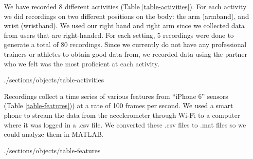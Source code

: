 We have recorded 8 different activities (Table \ref{table-activities}). For each activity we did recordings on two different positions on the body: the arm (armband), and wrist (wristband). We used our right hand and right arm since we collected data from users that are right-handed. For each setting, 5 recordings were done to generate a total of 80 recordings. Since we currently do not have any professional trainers or athletes to obtain good data from, we recorded data using the partner who we felt was the most proficient at each activity. 

 {./sections/objects/table-activities}

Recordings collect a time series of various features from “iPhone 6” sensors (Table \ref{table-features})) at a rate of 100 frames per second. We used a smart phone to stream the data from the accelerometer through Wi-Fi to a computer where it was logged in a .csv file. We converted these .csv files to .mat files so we could analyze them in MATLAB.

 {./sections/objects/table-features}
